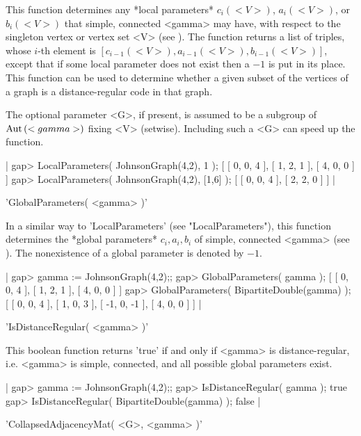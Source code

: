 This function determines any  *local parameters*  $c_i(<V>)$, $a_i(<V>)$,
or $b_i(<V>)$ that simple, connected  <gamma>  may have, with respect  to
the singleton vertex or vertex set <V>  (see \cite{BCN89}).  The function
returns   a     list    of   triples,   whose      $i$-th   element    is
$[c_{i-1}(<V>),a_{i-1}(<V>),b_{i-1}(<V>)]$,  except  that  if some  local
parameter does not exist then a $-1$ is  put in its place.  This function
can  be used  to determine whether  a given subset  of the  vertices of a
graph is a distance-regular code in that graph.

The optional parameter <G>, if  present, is  assumed to  be a subgroup of
${\rm Aut}\,(<gamma>)$ fixing <V> (setwise).  Including such a  <G> can speed up
the function.

|    gap> LocalParameters( JohnsonGraph(4,2), 1 );
    [ [ 0, 0, 4 ], [ 1, 2, 1 ], [ 4, 0, 0 ] ]
    gap> LocalParameters( JohnsonGraph(4,2), [1,6] );
    [ [ 0, 0, 4 ], [ 2, 2, 0 ] ] |


'GlobalParameters( <gamma> )'

In a similar   way  to 'LocalParameters'  (see "LocalParameters"),   this
function   determines the *global  parameters*  $c_i,a_i,b_i$  of simple,
connected  <gamma> (see \cite{BCN89}).    The  nonexistence of  a  global
parameter is denoted by $-1$.

|    gap> gamma := JohnsonGraph(4,2);;
    gap> GlobalParameters( gamma );
    [ [ 0, 0, 4 ], [ 1, 2, 1 ], [ 4, 0, 0 ] ]
    gap> GlobalParameters( BipartiteDouble(gamma) );
    [ [ 0, 0, 4 ], [ 1, 0, 3 ], [ -1, 0, -1 ], [ 4, 0, 0 ] ] |


'IsDistanceRegular( <gamma> )'

This  boolean   function  returns  'true'  if  and  only  if  <gamma>  is
distance-regular,  i.e. <gamma>  is simple, connected, and  all  possible
global parameters exist.

|    gap> gamma := JohnsonGraph(4,2);;
    gap> IsDistanceRegular( gamma );
    true
    gap> IsDistanceRegular( BipartiteDouble(gamma) );
    false |


'CollapsedAdjacencyMat( <G>, <gamma> )'

